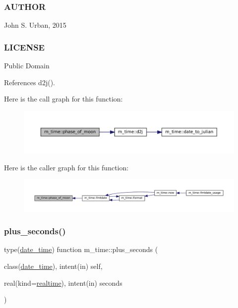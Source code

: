 \subsubsection*{A\+U\+T\+H\+OR}

John S. Urban, 2015 \subsubsection*{L\+I\+C\+E\+N\+SE}

Public Domain 

References d2j().

Here is the call graph for this function\+:\nopagebreak
\begin{figure}[H]
\begin{center}
\leavevmode
\includegraphics[width=350pt]{namespacem__time_ab8a976e2f113cc38b6df80974cee55dc_cgraph}
\end{center}
\end{figure}
Here is the caller graph for this function\+:\nopagebreak
\begin{figure}[H]
\begin{center}
\leavevmode
\includegraphics[width=350pt]{namespacem__time_ab8a976e2f113cc38b6df80974cee55dc_icgraph}
\end{center}
\end{figure}
\mbox{\label{namespacem__time_a76e79ee87552ce537cbb674a21b05b5c}} 
\subsubsection{\texorpdfstring{plus\+\_\+seconds()}{plus\_seconds()}}
{\footnotesize\ttfamily type(\mbox{\hyperlink{structm__time_1_1date__time}{date\+\_\+time}}) function m\+\_\+time\+::plus\+\_\+seconds (\begin{DoxyParamCaption}\item[{class(\mbox{\hyperlink{structm__time_1_1date__time}{date\+\_\+time}}), intent(in)}]{self,  }\item[{real(kind=\mbox{\hyperlink{namespacem__time_ac10ea9e8d59ec74eaa7d89f2517d7422}{realtime}}), intent(in)}]{seconds }\end{DoxyParamCaption})\hspace{0.3cm}{\ttfamily [private]}}



